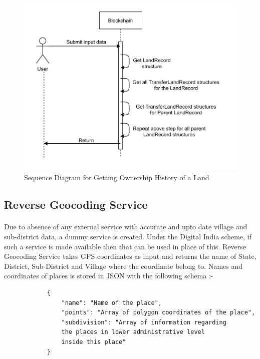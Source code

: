 \documentclass{article}
\begin{document}
        \begin{figure}[htbp]
            \includegraphics[scale=0.25]{blockchain_seq_get_history}
            \centering
            \caption{Sequence Diagram for Getting Ownership History of a Land}
        \end{figure}
    
    \subsection{Reverse Geocoding Service}
        \paragraph{}
        Due to absence of any external service with accurate and upto date village and sub-district data, a dummy service is created. Under the Digital India scheme, if such a service is made available then that can be used in place of this. Reverse Geocoding Service takes GPS coordinates as input and returns the name of State, District, Sub-District and Village where the coordinate belong to. Names and coordinates of places is stored in JSON with the following schema :-

        \begin{listing}[H]
        \begin{verbatim}
            {     
                "name": "Name of the place",
                "points": "Array of polygon coordinates of the place",
                "subdivision": "Array of information regarding
                the places in lower administrative level
                inside this place"
            }
        \end{verbatim}
        \end{listing}
        
\end{document}
